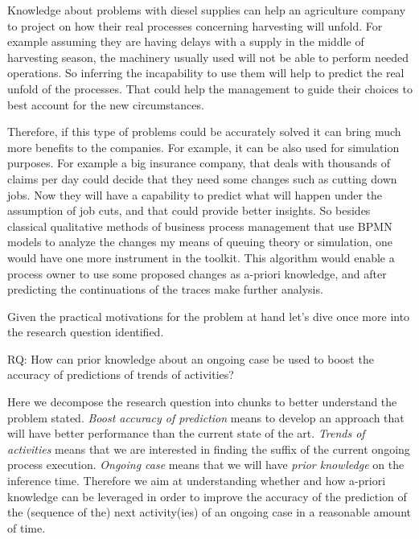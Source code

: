 Knowledge about problems with diesel supplies can help an agriculture company to project on how their real processes concerning harvesting will unfold. For example assuming they are having delays with a supply in the middle of harvesting season, the machinery usually used will not be able to perform needed operations. So inferring the incapability to use them will help to predict the real unfold of the processes. That could help the management to guide their choices to best account for the new circumstances. 


Therefore, if this type of problems could be accurately solved it can bring much more benefits to the companies. For example, it can be also used for simulation purposes. For example a big insurance company, that deals with thousands of claims per day could decide that they need some changes such as cutting down jobs. Now they will have a capability to predict what will happen under the assumption of job cuts, and that could provide better insights. So besides classical qualitative methods of business process management that use BPMN models to analyze the changes my means of queuing theory or simulation, one would have one more instrument in the toolkit. This algorithm would enable a process owner to use some proposed changes as a-priori knowledge, and after predicting the continuations of the traces make further analysis. 

Given the practical motivations for the problem at hand let's dive once more into the research question identified.

RQ: How can prior knowledge about an ongoing case be used to boost the accuracy of predictions of trends of activities?

Here we decompose the research question into chunks to better understand the problem stated. \textit{Boost accuracy of prediction} means to develop an approach that will have better performance than the current state of the art. \textit{Trends of activities} means that we are interested in finding the suffix of the current ongoing process execution. \textit{Ongoing case} means that we will have \textit{prior knowledge} on the inference time. Therefore we aim at understanding whether and how a-priori knowledge can be leveraged in order to improve the accuracy of the prediction of the (sequence of the) next activity(ies) of an ongoing case in a reasonable amount of time.


